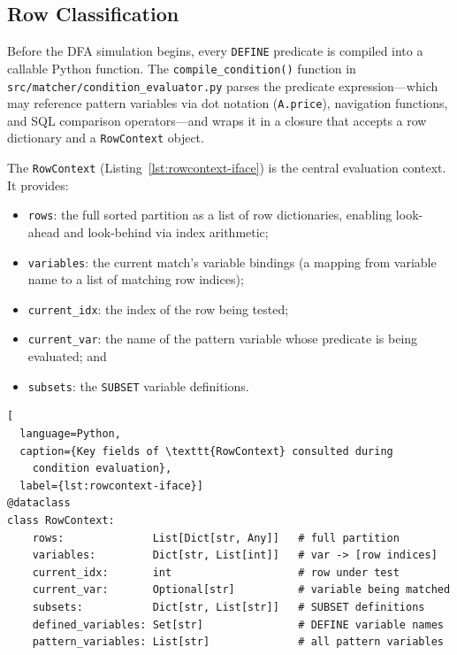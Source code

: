 \subsection{Row Classification}
\label{subsec:meth-exec-classify}

Before the DFA simulation begins, every \texttt{DEFINE} predicate
is compiled into a callable Python function.  The
\texttt{compile\_condition()} function in
\texttt{src/matcher/condition\_evaluator.py} parses the predicate
expression—which may reference pattern variables via dot notation
(\texttt{A.price}), navigation functions, and SQL comparison
operators—and wraps it in a closure that accepts a row dictionary
and a \texttt{RowContext} object.

The \texttt{RowContext}
(Listing~\ref{lst:rowcontext-iface}) is the central evaluation
context.  It provides:
\begin{itemize}
  \item \texttt{rows}: the full sorted partition as a list of row
    dictionaries, enabling look-ahead and look-behind via index
    arithmetic;
  \item \texttt{variables}: the current match's variable bindings
    (a mapping from variable name to a list of matching row
    indices);
  \item \texttt{current\_idx}: the index of the row being tested;
  \item \texttt{current\_var}: the name of the pattern variable
    whose predicate is being evaluated; and
  \item \texttt{subsets}: the \texttt{SUBSET} variable definitions.
\end{itemize}

\begin{lstlisting}[
  language=Python,
  caption={Key fields of \texttt{RowContext} consulted during
    condition evaluation},
  label={lst:rowcontext-iface}]
@dataclass
class RowContext:
    rows:              List[Dict[str, Any]]   # full partition
    variables:         Dict[str, List[int]]   # var -> [row indices]
    current_idx:       int                    # row under test
    current_var:       Optional[str]          # variable being matched
    subsets:           Dict[str, List[str]]   # SUBSET definitions
    defined_variables: Set[str]               # DEFINE variable names
    pattern_variables: List[str]              # all pattern variables
\end{lstlisting}

